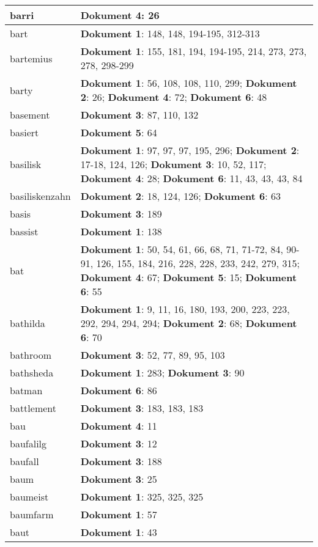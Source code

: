 \documentclass[a5paper]{article}
\begin{document}
\begin{longtable}[l]{|l|p{3in}|}
barri & \textbf{Dokument 4}: 26 \\
\hline
bart & \textbf{Dokument 1}: 148, 148, 194-195, 312-313 \\
\hline
bartemius & \textbf{Dokument 1}: 155, 181, 194, 194-195, 214, 273, 273, 278, 298-299 \\
\hline
barty & \textbf{Dokument 1}: 56, 108, 108, 110, 299; \textbf{Dokument 2}: 26; \textbf{Dokument 4}: 72; \textbf{Dokument 6}: 48 \\
\hline
basement & \textbf{Dokument 3}: 87, 110, 132 \\
\hline
basiert & \textbf{Dokument 5}: 64 \\
\hline
basilisk & \textbf{Dokument 1}: 97, 97, 97, 195, 296; \textbf{Dokument 2}: 17-18, 124, 126; \textbf{Dokument 3}: 10, 52, 117; \textbf{Dokument 4}: 28; \textbf{Dokument 6}: 11, 43, 43, 43, 84 \\
\hline
basiliskenzahn & \textbf{Dokument 2}: 18, 124, 126; \textbf{Dokument 6}: 63 \\
\hline
basis & \textbf{Dokument 3}: 189 \\
\hline
bassist & \textbf{Dokument 1}: 138 \\
\hline
bat & \textbf{Dokument 1}: 50, 54, 61, 66, 68, 71, 71-72, 84, 90-91, 126, 155, 184, 216, 228, 228, 233, 242, 279, 315; \textbf{Dokument 4}: 67; \textbf{Dokument 5}: 15; \textbf{Dokument 6}: 55 \\
\hline
bathilda & \textbf{Dokument 1}: 9, 11, 16, 180, 193, 200, 223, 223, 292, 294, 294, 294; \textbf{Dokument 2}: 68; \textbf{Dokument 6}: 70 \\
\hline
bathroom & \textbf{Dokument 3}: 52, 77, 89, 95, 103 \\
\hline
bathsheda & \textbf{Dokument 1}: 283; \textbf{Dokument 3}: 90 \\
\hline
batman & \textbf{Dokument 6}: 86 \\
\hline
battlement & \textbf{Dokument 3}: 183, 183, 183 \\
\hline
bau & \textbf{Dokument 4}: 11 \\
\hline
baufalilg & \textbf{Dokument 3}: 12 \\
\hline
baufall & \textbf{Dokument 3}: 188 \\
\hline
baum & \textbf{Dokument 3}: 25 \\
\hline
baumeist & \textbf{Dokument 1}: 325, 325, 325 \\
\hline
baumfarm & \textbf{Dokument 1}: 57 \\
\hline
baut & \textbf{Dokument 1}: 43 \\

\end{longtable}
\end{document}
